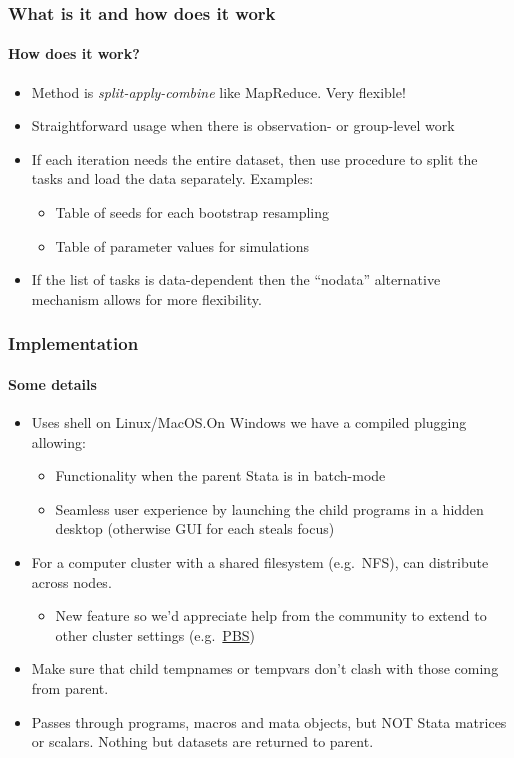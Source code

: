 \documentclass[9pt,\ExtraDocOpts]{beamer}
\begin{document}
\begin{frame} %
\frametitle{What is it and how does it work}
\framesubtitle{How does it work?}

\begin{itemize}
\item Method is \textit{split-apply-combine} like MapReduce. Very flexible!\pause{}
\item Straightforward usage when there is observation- or group-level work\pause{}
\item If each iteration needs the entire dataset, then use procedure to split the tasks and load the data separately. Examples:\pause{}
\begin{itemize}
\item Table of seeds for each bootstrap resampling\pause{}
\item Table of parameter values for simulations\pause{}
\end{itemize}
\item If the list of tasks is data-dependent then the ``nodata'' alternative mechanism allows for more flexibility.
\end{itemize}

\end{frame}


\begin{frame}
\frametitle{Implementation }
\framesubtitle{Some details}
\begin{itemize}
\item Uses shell on Linux/MacOS.\@ On Windows we have a compiled plugging allowing:\pause{}
\begin{itemize}
\item Functionality when the parent Stata is in batch-mode\pause{}
\item Seamless user experience by launching the child programs in a hidden desktop (otherwise GUI for each steals focus)\pause{}
\end{itemize}
\item For a computer cluster with a shared filesystem (e.g.\ NFS), can distribute across nodes. \pause{}
\begin{itemize}
\item New feature so we'd appreciate help from the community to extend to other cluster settings (e.g.\ \href{https://en.wikipedia.org/wiki/Portable_Batch_System}{PBS})\pause{}
\end{itemize}
\item Make sure that child tempnames or tempvars don't clash with those coming from parent.\pause{}
\item Passes through programs, macros and mata objects, but NOT Stata matrices or scalars. Nothing but datasets are returned to parent.
\end{itemize}
\end{frame}
\end{document}
